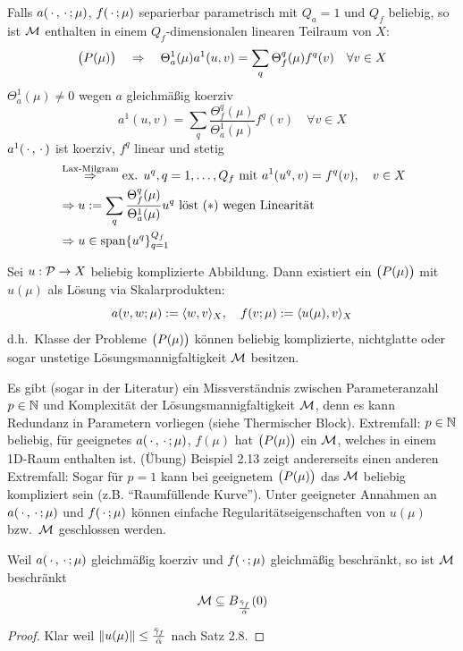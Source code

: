 \begin{bsp}[$Q_a = 1$]
	Falls $a(\,\cdot\,,\,\cdot\,;\mu)$, $f(\,\cdot\,;\mu)$ separierbar parametrisch mit $Q_a = 1$ und $Q_f$ beliebig, so ist $\mathcal{M}$ enthalten in einem $Q_f$-dimensionalen linearen Teilraum von $X$:
	\[
		\big(P(\mu)\big) \quad \Rightarrow \quad \Theta_a^1(\mu) a^1(u,v) = \sum_q \Theta_f^q(\mu) f^q(v) \quad \forall v \in X
	\]
	$\Theta_a^1(\mu) \neq 0$ wegen $a$ gleichmäßig koerziv
	\[
		a^1(u,v) = \sum_q \frac{\Theta_f^q(\mu)}{\Theta_a^1(\mu)} f^q(v) \quad \forall v \in X \tag{$*$}
	\]
	$a^1(\,\cdot\,,\,\cdot\,)$ ist koerziv, $f^q$ linear und stetig
	\begin{align*}
		&\stackrel{\text{Lax-Milgram}}{\Rightarrow} \text{ex. } u^q, q=1,\dots,Q_f \text{ mit } a^1(u^q,v) = f^q(v), \quad v \in X\\
		&\Rightarrow u := \sum_q \frac{\Theta_f^q(\mu)}{\Theta_a^1(\mu)} u^q \text{ löst } (*) \text{ wegen Linearität}\\
		&\Rightarrow u \in \operatorname{span}\{u^q\}_{q=1}^{Q_f}
	\end{align*}
\end{bsp}

\begin{bsp}
	Sei $u : \mathcal{P} \to X$ beliebig komplizierte Abbildung.
	Dann existiert ein $\big(P(\mu)\big)$ mit $u(\mu)$ als Lösung via Skalarprodukten:
	\[
		a(v,w;\mu) := \langle w, v \rangle_X, \quad f(v;\mu) := \langle u(\mu), v \rangle_X
	\]
	d.h.\ Klasse der Probleme $\big(P(\mu)\big)$ können beliebig komplizierte, nichtglatte oder sogar unstetige Lösungsmannigfaltigkeit $\mathcal{M}$ besitzen.
\end{bsp}

\begin{bem}
	Es gibt (sogar in der Literatur) ein Missverständnis zwischen Parameteranzahl $p \in \mathbb{N}$ und Komplexität der Lösungsmannigfaltigkeit $\mathcal{M}$, denn es kann Redundanz in Parametern vorliegen (siehe Thermischer Block).
	Extremfall: $p \in \mathbb{N}$ beliebig, für geeignetes $a(\,\cdot\,,\,\cdot\,;\mu)$, $f(\mu)$ hat $\big(P(\mu)\big)$ ein $\mathcal{M}$, welches in einem 1D-Raum enthalten ist. (Übung)
	Beispiel 2.13 zeigt andererseits einen anderen Extremfall: Sogar für $p=1$ kann bei geeignetem $\big(P(\mu)\big)$ das $\mathcal{M}$ beliebig kompliziert sein (z.B. ``Raumfüllende Kurve'').
	Unter geeigneter Annahmen an $a(\,\cdot\,,\,\cdot\,;\mu)$ und $f(\,\cdot\,;\mu)$ können einfache Regularitätseigenschaften von $u(\mu)$ bzw.\ $\mathcal{M}$ geschlossen werden.
\end{bem}

\begin{kor}
	Weil $a(\,\cdot\,,\,\cdot\,;\mu)$ gleichmäßig koerziv und $f(\,\cdot\,;\mu)$ gleichmäßig beschränkt, so ist $\mathcal{M}$ beschränkt
	\[
		\mathcal{M} \subseteq B_{\frac{\bar\gamma_f}{\bar\alpha}}(0)
	\]

	\begin{proof}
		Klar weil $\|u(\mu)\| \leq \frac{\bar\gamma_f}{\bar\alpha}$ nach Satz 2.8.
	\end{proof}
\end{kor}

